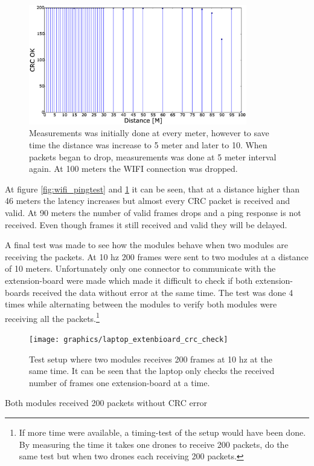 \begin{figure}[H]
    \center
    \includegraphics[width=0.85\textwidth]{graphics/crc_distance_check.eps}
	\caption{Measurements was initially done at every meter, however to save time the distance was increase to 5 meter and later to 10. When packets began to drop, measurements was done at 5 meter interval again. At 100 meters the WIFI connection was dropped.}
    \label{fig:wifi_crc_check}
\end{figure}

At figure \ref{fig:wifi_pingtest} and \ref{fig:wifi_crc_check} it can be seen, that at a distance higher than 46 meters the latency increases but almost every CRC packet is received and valid. At 90 meters the number of valid frames drops and a ping response is not received. Even though frames it still received and valid they will be delayed.


A final test was made to see how the modules behave when two modules are receiving the packets. At 10 hz 200 frames were sent to two modules at a distance of 10 meters.
Unfortunately only one connector to communicate with the extension-board were made which made it difficult to check if both extension-boards received the data without error at the same time. The test was done 4 times while alternating between the modules to verify both modules were receiving all the packets.\footnote{If more time were available, a timing-test of the setup would have been done. By measuring the time it takes one drones to receive 200 packets, do the same test but when two drones each receiving 200 packets.}
\begin{figure}[H]
    \centering
        \texttt{[image: graphics/laptop\_extenbioard\_crc\_check]}
        \caption{Test setup where two modules receives 200 frames at 10 hz at the same time. It can be seen that the laptop only checks the received number of frames one extension-board at a time.}
        \label{fig:crc_distance_check}
\end{figure}
Both modules received 200 packets without CRC error 

